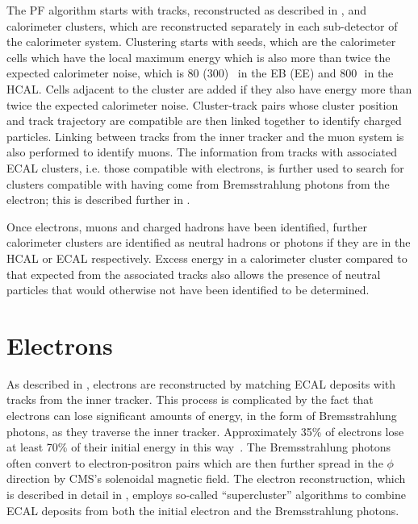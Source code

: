The \ac{PF} algorithm starts with tracks, reconstructed as described in , and calorimeter clusters, which are reconstructed separately in each sub-detector of the calorimeter system. Clustering starts with seeds, which are the calorimeter cells which have the local maximum energy which is also more than twice the expected calorimeter noise, which is 80 (300) \MeV\, in the \ac{EB} (\ac{EE}) and 800\,\MeV\, in the \ac{HCAL}. Cells adjacent to the cluster are added if they also have energy more than twice the expected calorimeter noise. Cluster-track pairs whose cluster position and track trajectory are compatible are then linked together to identify charged particles. Linking between tracks from the inner tracker and the muon system is also performed to identify muons. The information from tracks with associated \ac{ECAL} clusters, i.e. those compatible with electrons, is further used to search for clusters compatible with having come from Bremsstrahlung photons from the electron; this is described further in .

Once electrons, muons and charged hadrons have been identified, further calorimeter clusters are identified as neutral hadrons or photons if they are in the \ac{HCAL} or \ac{ECAL} respectively. Excess energy in a calorimeter cluster compared to that expected from the associated tracks also allows the presence of neutral particles that would otherwise not have been identified to be determined.

\section{Electrons}
\label{sec:electrons}
As described in , electrons are reconstructed by matching \ac{ECAL} deposits with tracks from the inner tracker. This process is complicated by the fact that electrons can lose significant amounts of energy, in the form of Bremsstrahlung photons, as they traverse the inner tracker. Approximately 35\% of electrons lose at least 70\% of their initial energy in this way~\cite{Baffioni:2006cd}. The Bremsstrahlung photons often convert to electron-positron pairs which are then further spread in the $\phi$ direction by CMS's solenoidal magnetic field. The electron reconstruction, which is described in detail in , employs so-called ``supercluster'' algorithms to combine \ac{ECAL} deposits from both the initial electron and the Bremsstrahlung photons.

